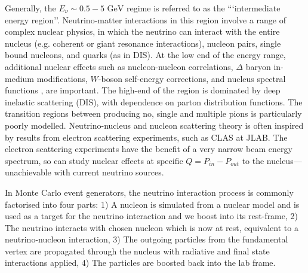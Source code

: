 Generally, the $E_\nu \sim 0.5-5\text{ GeV}$ regime is referred to as the ```intermediate energy region''. Neutrino-matter interactions in this region involve a range of complex nuclear physics, in which the neutrino can interact with the entire nucleus (e.g. coherent\cite{Berger_Sehgal_coh} or giant resonance\cite{crpa} interactions), nucleon pairs, single bound nucleons, and quarks (as in DIS). At the low end of the energy range, additional nuclear effects such as nucleon-nucleon correlations\cite{nieves1,nieves2}, $\Delta$ baryon in-medium modifications\cite{nuclear_effects_1pi}, $W$-boson self-energy corrections\cite{nieves1}, and nucleus spectral functions \cite{benhar}, are important. The high-end of the region is dominated by deep inelastic scattering (DIS), with dependence on parton distribution functions. The transition regions between producing no, single and multiple pions is particularly poorly modelled\cite{katori_martini,ulrich_review,nieves_review}. Neutrino-nucleus and nucleon scattering theory is often inspired by results from electron scattering experiments\cite{joanna}, such as CLAS\cite{clas} at JLAB. The electron scattering experiments have the benefit of a very narrow beam energy spectrum, so can study nuclear effects at specific $Q=P_{in}-P_{out}$ to the nucleus---unachievable with current neutrino sources.

In Monte Carlo event generators, the neutrino interaction process is commonly factorised into four parts: 1) A nucleon is simulated from a nuclear model and is used as a target for the neutrino interaction and we boost into its rest-frame, 2) The neutrino interacts with chosen nucleon which is now at rest, equivalent to a neutrino-nucleon interaction, 3) The outgoing particles from the fundamental vertex are propagated through the nucleus with radiative and final state interactions applied, 4) The particles are boosted back into the lab frame.

